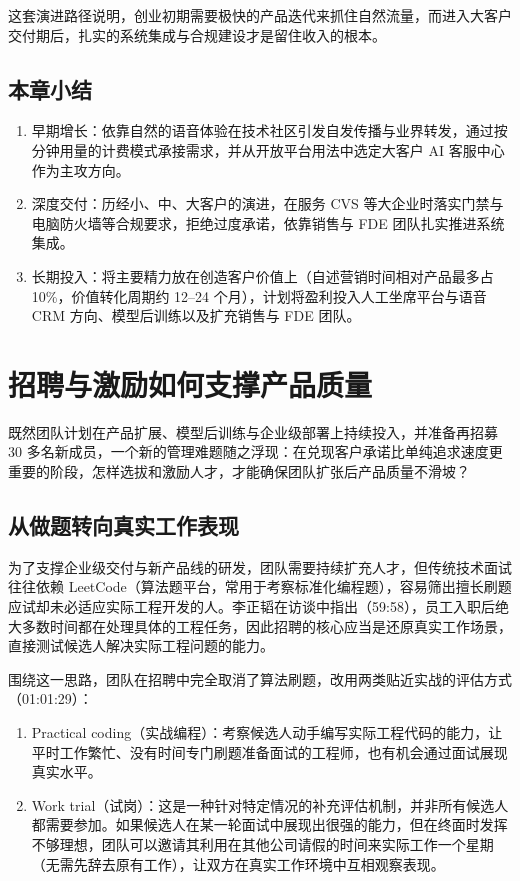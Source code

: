 \documentclass[UTF8,a4paper,11pt,fontset=fandol]{ctexart}
\begin{document}
这套演进路径说明，创业初期需要极快的产品迭代来抓住自然流量，而进入大客户交付期后，扎实的系统集成与合规建设才是留住收入的根本。
\subsection{本章小结}
\begin{enumerate}
\item 早期增长：依靠自然的语音体验在技术社区引发自发传播与业界转发，通过按分钟用量的计费模式承接需求，并从开放平台用法中选定大客户 AI 客服中心作为主攻方向。
\item 深度交付：历经小、中、大客户的演进，在服务 CVS 等大企业时落实门禁与电脑防火墙等合规要求，拒绝过度承诺，依靠销售与 FDE 团队扎实推进系统集成。
\item 长期投入：将主要精力放在创造客户价值上（自述营销时间相对产品最多占 10\%，价值转化周期约 12–24 个月），计划将盈利投入人工坐席平台与语音 CRM 方向、模型后训练以及扩充销售与 FDE 团队。
\end{enumerate}
\section{招聘与激励如何支撑产品质量}
既然团队计划在产品扩展、模型后训练与企业级部署上持续投入，并准备再招募 30 多名新成员，一个新的管理难题随之浮现：在兑现客户承诺比单纯追求速度更重要的阶段，怎样选拔和激励人才，才能确保团队扩张后产品质量不滑坡？
\subsection{从做题转向真实工作表现}
为了支撑企业级交付与新产品线的研发，团队需要持续扩充人才，但传统技术面试往往依赖 LeetCode（算法题平台，常用于考察标准化编程题），容易筛出擅长刷题应试却未必适应实际工程开发的人。李正韬在访谈中指出（59:58），员工入职后绝大多数时间都在处理具体的工程任务，因此招聘的核心应当是还原真实工作场景，直接测试候选人解决实际工程问题的能力。

围绕这一思路，团队在招聘中完全取消了算法刷题，改用两类贴近实战的评估方式（01:01:29）：
\begin{enumerate}
\item Practical coding（实战编程）：考察候选人动手编写实际工程代码的能力，让平时工作繁忙、没有时间专门刷题准备面试的工程师，也有机会通过面试展现真实水平。
\item Work trial（试岗）：这是一种针对特定情况的补充评估机制，并非所有候选人都需要参加。如果候选人在某一轮面试中展现出很强的能力，但在终面时发挥不够理想，团队可以邀请其利用在其他公司请假的时间来实际工作一个星期（无需先辞去原有工作），让双方在真实工作环境中互相观察表现。
\end{enumerate}
\end{document}
